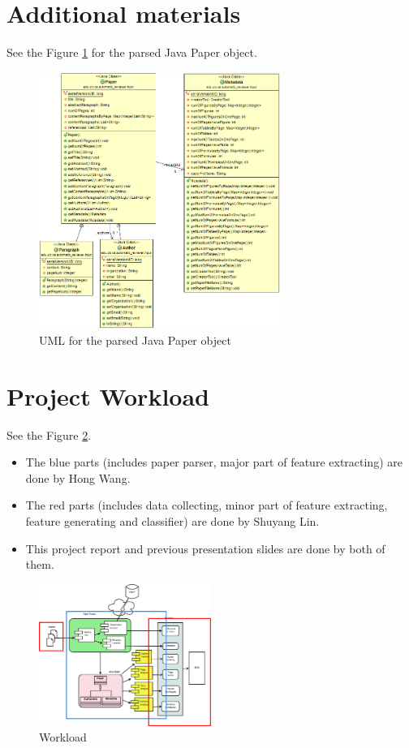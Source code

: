 \documentclass[11pt,letterpaper]{article}
\begin{document}
\section{Additional materials}
See the Figure \ref{fig:uml} for the parsed Java Paper object.  
\begin{figure}[htb]
  \centering
	 	 \includegraphics[width=0.7\textwidth]{materials/paper_uml.png}
		\caption{UML for the parsed Java Paper object}
		\label{fig:uml}
\end{figure}



\section{Project Workload}
See the Figure \ref{fig:workload}.
\begin{itemize}
\item The blue parts (includes paper parser, major part of feature extracting) are done by Hong Wang.
\item	The red parts (includes data collecting, minor part of feature extracting, feature generating and classifier) are done by Shuyang Lin.
\item	This project report and previous presentation slides are done by both of them. 
\end{itemize}


\begin{figure}[htb]
  \centering
	 	 \includegraphics[width=0.5\textwidth]{materials/workload.eps}
		\caption{Workload}
		\label{fig:workload}
\end{figure}
\end{document}
